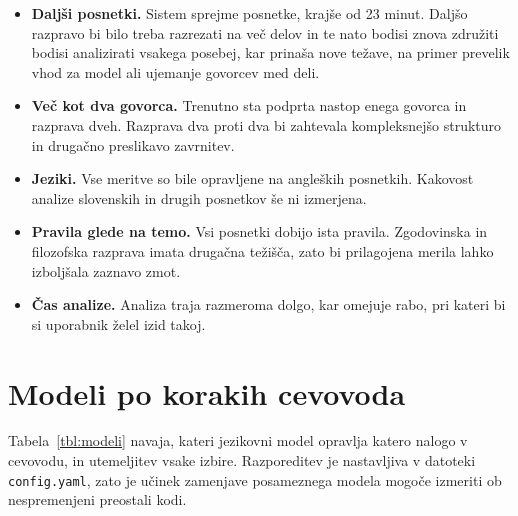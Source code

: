 \documentclass[a4paper, 12pt]{book}
\begin{document}
\begin{itemize}
\item \textbf{Daljši posnetki.} Sistem sprejme posnetke, krajše od 23 minut.
      Daljšo razpravo bi bilo treba razrezati na več delov in te nato bodisi
      znova združiti bodisi analizirati vsakega posebej, kar prinaša nove
      težave, na primer prevelik vhod za model ali ujemanje govorcev med deli.
\item \textbf{Več kot dva govorca.} Trenutno sta podprta nastop enega govorca
      in razprava dveh. Razprava dva proti dva bi zahtevala kompleksnejšo strukturo in drugačno preslikavo zavrnitev.
\item \textbf{Jeziki.} Vse meritve so bile opravljene na angleških posnetkih.
      Kakovost analize slovenskih in drugih posnetkov še ni izmerjena.
\item \textbf{Pravila glede na temo.} Vsi posnetki dobijo ista pravila.
      Zgodovinska in filozofska razprava imata drugačna težišča, zato bi
      prilagojena merila lahko izboljšala zaznavo zmot.
\item \textbf{Čas analize.} Analiza traja razmeroma dolgo, kar omejuje rabo,
      pri kateri bi si uporabnik želel izid takoj.
\end{itemize}

\cleardoublepage
{}



\appendix

\chapter{Modeli po korakih cevovoda}
\label{app:modeli}

Tabela~\ref{tbl:modeli} navaja, kateri jezikovni model opravlja katero nalogo v
cevovodu, in utemeljitev vsake izbire. Razporeditev je nastavljiva v datoteki
\texttt{config.yaml}, zato je učinek zamenjave posameznega modela mogoče
izmeriti ob nespremenjeni preostali kodi.
\end{document}
